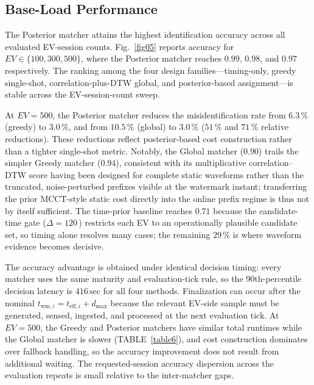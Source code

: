 \documentclass{ieeeaccess}
\begin{document}
    \subsection{Base-Load Performance}
    The Posterior matcher attains the highest identification accuracy across all evaluated EV-session counts.
    Fig.~\ref{fig05} reports accuracy for $EV \in \{100, 300, 500\}$, where the Posterior matcher reaches $0.99$, $0.98$, and $0.97$ respectively.
    The ranking among the four design families---timing-only, greedy single-shot, correlation-plus-DTW global, and posterior-based assignment---is stable across the EV-session-count sweep.

    At $EV = 500$, the Posterior matcher reduces the misidentification rate from $6.3\,\%$ (greedy) to $3.0\,\%$, and from $10.5\,\%$ (global) to $3.0\,\%$ ($51\,\%$ and $71\,\%$ relative reductions).
    These reductions reflect posterior-based cost construction rather than a tighter single-shot metric.
    Notably, the Global matcher ($0.90$) trails the simpler Greedy matcher ($0.94$), consistent with its multiplicative correlation--DTW score having been designed for complete static waveforms rather than the truncated, noise-perturbed prefixes visible at the watermark instant; transferring the prior MCCT-style static cost directly into the online prefix regime is thus not by itself sufficient.
    The time-prior baseline reaches $0.71$ because the candidate-time gate ($\Delta = 120$\,) restricts each EV to an operationally plausible candidate set, so timing alone resolves many cases; the remaining $29\,\%$ is where waveform evidence becomes decisive.

    The accuracy advantage is obtained under identical decision timing: every matcher uses the same maturity and evaluation-tick rule, so the 90th-percentile decision latency is $416\,\text{sec}$ for all four methods.
    Finalization can occur after the nominal $t_{\text{wm},i}=t_{\text{eff},i}+d_{\max}$ because the relevant EV-side sample must be generated, sensed, ingested, and processed at the next evaluation tick.
    At $EV = 500$, the Greedy and Posterior matchers have similar total runtimes while the Global matcher is slower (TABLE~\ref{table6}), and cost construction dominates over fallback handling, so the accuracy improvement does not result from additional waiting.
    The requested-session accuracy dispersion across the evaluation repeats is small relative to the inter-matcher gaps.
\end{document}
